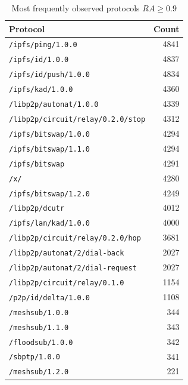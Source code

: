 \documentclass[10pt,a4paper,twocolumn]{article}
\begin{document}
\begin{table}[H]
    \centering
    \small
    \caption{Most frequently observed protocols \(RA \ge 0.9\)}
    \label{tab:protocol_counts_global}
    \begin{tabular}{lr}
        \hline
        Protocol & Count \\
        \hline
        \texttt{/ipfs/ping/1.0.0} & 4841 \\
        \texttt{/ipfs/id/1.0.0} & 4837 \\
        \texttt{/ipfs/id/push/1.0.0} & 4834 \\
        \texttt{/ipfs/kad/1.0.0} & 4360 \\
        \texttt{/libp2p/autonat/1.0.0} & 4339 \\
        \texttt{/libp2p/circuit/relay/0.2.0/stop} & 4312 \\
        \texttt{/ipfs/bitswap/1.0.0} & 4294 \\
        \texttt{/ipfs/bitswap/1.1.0} & 4294 \\
        \texttt{/ipfs/bitswap} & 4291 \\
        \texttt{/x/} & 4280 \\
        \texttt{/ipfs/bitswap/1.2.0} & 4249 \\
        \texttt{/libp2p/dcutr} & 4012 \\
        \texttt{/ipfs/lan/kad/1.0.0} & 4000 \\
        \texttt{/libp2p/circuit/relay/0.2.0/hop} & 3681 \\
        \texttt{/libp2p/autonat/2/dial-back} & 2027 \\
        \texttt{/libp2p/autonat/2/dial-request} & 2027 \\
        \texttt{/libp2p/circuit/relay/0.1.0} & 1154 \\
        \texttt{/p2p/id/delta/1.0.0} & 1108 \\
        \texttt{/meshsub/1.0.0} & 344 \\
        \texttt{/meshsub/1.1.0} & 343 \\
        \texttt{/floodsub/1.0.0} & 342 \\
        \texttt{/sbptp/1.0.0} & 341 \\
        \texttt{/meshsub/1.2.0} & 221 \\
        \hline
    \end{tabular}
\end{table}
\end{document}
